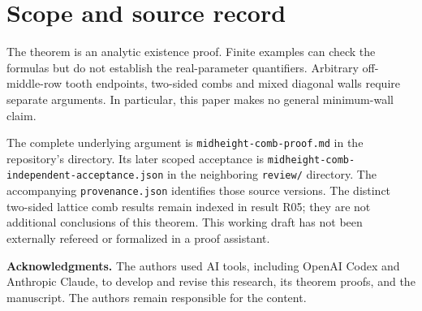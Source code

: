 \documentclass[11pt]{article}
\theoremstyle{definition}
\begin{document}
\section{Scope and source record}
The theorem is an analytic existence proof. Finite examples can check the formulas but do not establish the real-parameter quantifiers. Arbitrary off-middle-row tooth endpoints, two-sided combs and mixed diagonal walls require separate arguments. In particular, this paper makes no general minimum-wall claim.

The complete underlying argument is \texttt{midheight-comb-proof.md} in the repository's  directory. Its later scoped acceptance is \texttt{midheight-comb-independent-acceptance.json} in the neighboring \texttt{review/} directory. The accompanying \texttt{provenance.json} identifies those source versions. The distinct two-sided lattice comb results remain indexed in result R05; they are not additional conclusions of this theorem. This working draft has not been externally refereed or formalized in a proof assistant.

\smallskip\noindent\textbf{Acknowledgments.} The authors used AI tools, including OpenAI Codex and Anthropic Claude, to develop and revise this research, its theorem proofs, and the manuscript. The authors remain responsible for the content.
\end{document}
